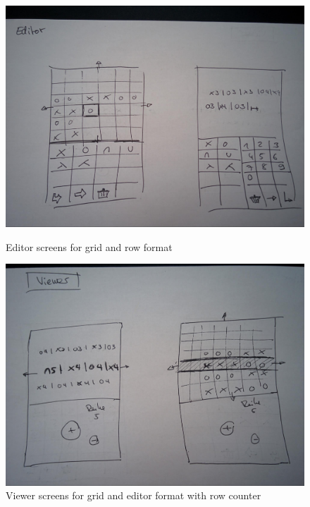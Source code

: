 \begin{figure}
\centering
\begin{minipage}{1\textwidth}
  \centering
  \includegraphics[width=1\linewidth]{images/image00.jpg}
  \caption{Editor screens for grid and row format}
  \label{fig_wireframe3}
\end{minipage}

\begin{minipage}{1\textwidth}
  \centering
  \includegraphics[width=1\linewidth]{images/image02.jpg}
  \caption{Viewer screens for grid and editor format with row counter}
  \label{fig_wireframe4}
\end{minipage}
\end{figure}